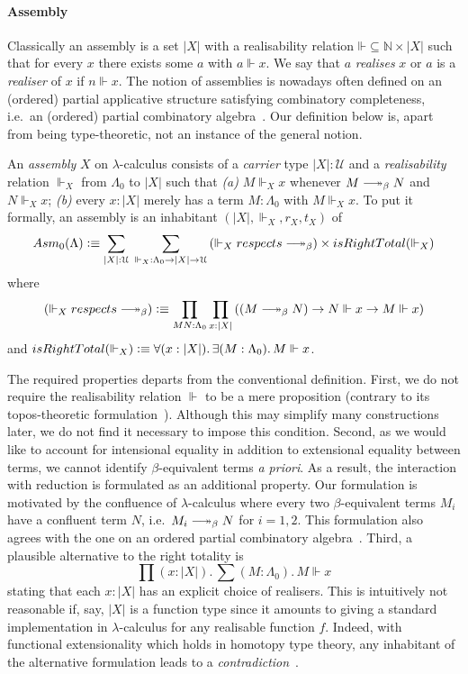 \documentclass[a4paper,UKenglish,numberwithinsect,cleveref,thm-restate]{lipics-v2021}
\newcommand{\Asm}{\mathsf{Asm}}
\newcommand{\defeq}{\vcentcolon\equiv}
\newcommand{\Univ}{\mathcal{U}}
\DeclareRobustCommand\longtwoheadrightarrow{\relbar\joinrel\twoheadrightarrow}
\newcommand{\reduce}{\longtwoheadrightarrow_{\beta}}
\theoremstyle{plain}
\begin{document}
\paragraph*{Assembly}
Classically an assembly is a set $|X|$ with a realisability relation $\mathord{\Vdash} \subseteq \mathbb{N} \times |X|$ such that for every $x$ there exists some $a$ with $a \Vdash x$. We say that $a$ \emph{realises} $x$ or $a$ is a \emph{realiser} of $x$ if $n \Vdash x$.
The notion of assemblies is nowadays often defined on an (ordered) partial applicative structure satisfying combinatory completeness, i.e.\ an (ordered) partial combinatory algebra~\cite{Oosten2008}.
Our definition below is, apart from being type-theoretic, not an instance of the general notion.
\begin{definition}\label{def:assembly}
  An \emph{assembly} $X$ on $\lambda$-calculus consists of a \emph{carrier} type $|X| : \Univ$ and a \emph{realisability} relation ${\Vdash_X}$ from $\Lambda_0$ to $|X|$ such that
  \emph{(a)} $M \Vdash_X x$ whenever $M \reduce N$ and $N \Vdash_X x$;
  \emph{(b)} every $x : |X|$ merely has a term $M : \Lambda_0$ with $M \Vdash_X x$. 
  To put it formally, an assembly is an inhabitant $(|X|, \Vdash_X, r_X, t_X)$ of
  \[
    \Asm_0(\Lambda) \defeq \sum_{|X| : \Univ}\;\sum_{\mathord{\Vdash_X}:\Lambda_0 \to |X| \to \Univ} 
    \left(\mathord{\Vdash_X}\;\mathsf{respects}\;\mathord{\reduce}\right)
      \times \mathsf{isRightTotal}({\Vdash_X})
  \]
  where 
  \[
    \left(\mathord{\Vdash_X}\;\mathsf{respects}\;\mathord{\reduce}\right) \defeq
    \prod_{M N : \Lambda_0} \prod_{x : |X|} \left( \left(M \reduce N\right) \to N \Vdash x \to M \Vdash x \right)
  \]
  and $\mathsf{isRightTotal}(\Vdash_X) \defeq \forall (x : |X|).\, \exists (M : \Lambda_0).\, M \Vdash x$.
\end{definition}
The required properties departs from the conventional definition. 
First, we do not require the realisability relation $\Vdash$ to be a mere proposition (contrary to its topos-theoretic formulation~\cite{Birkedal2002a}).
Although this may simplify many constructions later, we do not find it necessary to impose this condition.
Second, as we would like to account for intensional equality in addition to extensional equality between terms,
we cannot identify $\beta$-equivalent terms \emph{a priori}.
As a result, the interaction with reduction is formulated as an additional property. 
Our formulation is motivated by the confluence of $\lambda$-calculus where every two $\beta$-equivalent terms $M_i$ have a confluent term $N$, i.e.\ $M_i \reduce N$ for $i = 1, 2$.
This formulation also agrees with the one on an ordered partial combinatory algebra~\cite[Section~2.3]{Hofstra2003}.
Third, a plausible alternative to the right totality is
\[
  \prod (x : |X|).\, \sum (M : \Lambda_0).\, M \Vdash x
\]
stating that each $x : |X|$ has an explicit choice of realisers.
This is intuitively not reasonable if, say, $|X|$ is a function type since it amounts to giving a standard implementation in $\lambda$-calculus for any realisable function $f$.
Indeed, with functional extensionality which holds in homotopy type theory, any inhabitant of the alternative formulation leads to a \emph{contradiction}~\cite{Troelstra1977}. 
\end{document}

